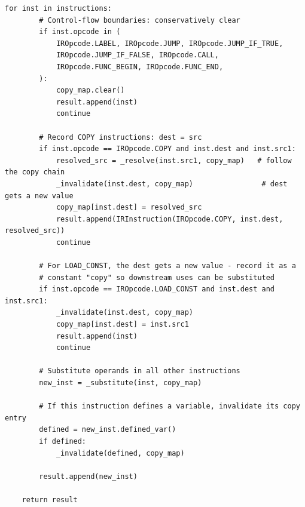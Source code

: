 \begin{lstlisting}[style=snippet]
    for inst in instructions:
        # Control-flow boundaries: conservatively clear
        if inst.opcode in (
            IROpcode.LABEL, IROpcode.JUMP, IROpcode.JUMP_IF_TRUE,
            IROpcode.JUMP_IF_FALSE, IROpcode.CALL,
            IROpcode.FUNC_BEGIN, IROpcode.FUNC_END,
        ):
            copy_map.clear()
            result.append(inst)
            continue

        # Record COPY instructions: dest = src
        if inst.opcode == IROpcode.COPY and inst.dest and inst.src1:
            resolved_src = _resolve(inst.src1, copy_map)   # follow the copy chain
            _invalidate(inst.dest, copy_map)                # dest gets a new value
            copy_map[inst.dest] = resolved_src
            result.append(IRInstruction(IROpcode.COPY, inst.dest, resolved_src))
            continue

        # For LOAD_CONST, the dest gets a new value - record it as a
        # constant "copy" so downstream uses can be substituted
        if inst.opcode == IROpcode.LOAD_CONST and inst.dest and inst.src1:
            _invalidate(inst.dest, copy_map)
            copy_map[inst.dest] = inst.src1
            result.append(inst)
            continue

        # Substitute operands in all other instructions
        new_inst = _substitute(inst, copy_map)

        # If this instruction defines a variable, invalidate its copy entry
        defined = new_inst.defined_var()
        if defined:
            _invalidate(defined, copy_map)

        result.append(new_inst)

    return result
\end{lstlisting}

